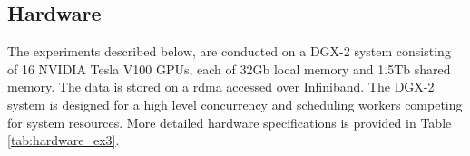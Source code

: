 
\subsection{Hardware} \label{sec:hardware}
The experiments described below, are conducted on a 
DGX-2 system consisting of 16 NVIDIA Tesla V100 GPUs, each of 32Gb local memory and 1.5Tb shared memory. %
The data is stored on a \acrfull{rdma} accessed over Infiniband. %
The DGX-2 system is designed for a high level concurrency and scheduling workers competing for system resources. More detailed hardware specifications is provided in Table \ref{tab:hardware_ex3}.
